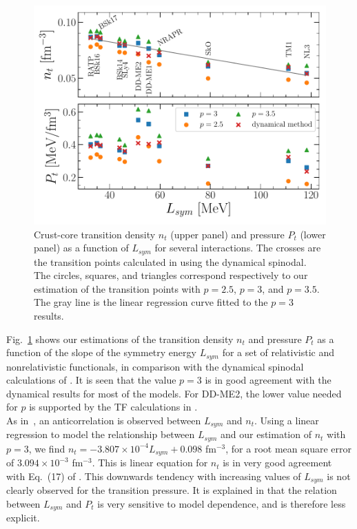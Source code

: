 \begin{figure}[!t]
\begin{center}
  \includegraphics[width=0.9\linewidth]{figures/cctp_lsym.pdf}
\end{center}
\caption[Crust-core transition density and pressure for several interactions]{Crust-core 
  transition density $n_t$ (upper panel) and pressure $P_t$ 
(lower panel) as a function of $L_{sym}$ for several interactions. The crosses 
are the transition points calculated in \cite{Ducoin2011} using the dynamical
spinodal. The circles, squares, and triangles correspond respectively to our
estimation of the transition points with $p=2.5$, $p=3$, 
and $p=3.5$. The gray line is the linear regression curve fitted to the $p=3$ 
results.}\label{fig:cctp_lsym}
\end{figure}

Fig.~\ref{fig:cctp_lsym} shows our estimations of the transition density $n_t$ 
and pressure $P_t$ as a function of the slope of the symmetry energy $L_{sym}$ 
for a set of relativistic and nonrelativistic functionals, in 
comparison with the dynamical spinodal calculations of \cite{Ducoin2011}. It is
seen that the value $p=3$ is in good agreement with the dynamical results for
most of the models. For DD-ME2, the lower value needed for $p$ is supported by
the TF calculations in \cite{Grill2012}.\\
As in~\cite{Vinas2017}, an anticorrelation is observed between $L_{sym}$ and 
$n_t$. Using a linear regression to model the relationship between $L_{sym}$
and our estimation of $n_t$ with $p=3$, we find $n_t = -3.807\times
10^{-4}L_{sym} + 0.098$ fm$^{-3}$, for a root mean square error of 
$3.094\times 10^{-3}$ fm$^{-3}$. This is linear equation for $n_t$ is in very
good agreement with Eq.~(17) of \cite{Ducoin2011}.
This downwards tendency with increasing values of $L_{sym}$ is not clearly 
observed for the transition pressure. It is explained in \cite{Ducoin2011} that
the relation between $L_{sym}$ and $P_t$ is very sensitive to model dependence,
and is therefore less explicit.


